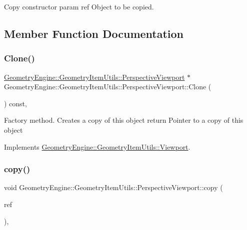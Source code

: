 Copy constructor param ref Object to be copied. 

\subsection{Member Function Documentation}
\mbox{\label{class_geometry_engine_1_1_geometry_item_utils_1_1_perspective_viewport_a828a22e5d39e7c8d1812e97f582bf667}} 
\subsubsection{\texorpdfstring{Clone()}{Clone()}}
{\footnotesize\ttfamily \mbox{\hyperlink{class_geometry_engine_1_1_geometry_item_utils_1_1_perspective_viewport}{Geometry\+Engine\+::\+Geometry\+Item\+Utils\+::\+Perspective\+Viewport}} $\ast$ Geometry\+Engine\+::\+Geometry\+Item\+Utils\+::\+Perspective\+Viewport\+::\+Clone (\begin{DoxyParamCaption}{ }\end{DoxyParamCaption}) const\hspace{0.3cm}{\ttfamily [override]}, {\ttfamily [virtual]}}

Factory method. Creates a copy of this object return Pointer to a copy of this object 

Implements \mbox{\hyperlink{class_geometry_engine_1_1_geometry_item_utils_1_1_viewport_a8bd47866a001eae03f88df67fd699904}{Geometry\+Engine\+::\+Geometry\+Item\+Utils\+::\+Viewport}}.

\mbox{\label{class_geometry_engine_1_1_geometry_item_utils_1_1_perspective_viewport_af751fd63329fb5f80965e3f864afb4b7}} 
\subsubsection{\texorpdfstring{copy()}{copy()}}
{\footnotesize\ttfamily void Geometry\+Engine\+::\+Geometry\+Item\+Utils\+::\+Perspective\+Viewport\+::copy (\begin{DoxyParamCaption}\item[{const \mbox{\hyperlink{class_geometry_engine_1_1_geometry_item_utils_1_1_perspective_viewport}{Perspective\+Viewport}} \&}]{ref }\end{DoxyParamCaption})\hspace{0.3cm}{\ttfamily [protected]}, {\ttfamily [virtual]}}

